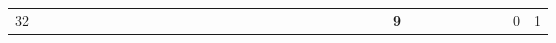 \begin{landscape}
\begin{table}
\begin{adjustwidth}{-2.6cm}{}
{\begin{tabular}{l|lllllllllllllllllllllllllllllllll|ll}
		32   &            &                                                                 &                                                                 &                                                                 &                                                                 &                                                                 &                                                                 &                                                                 &                                                                 &                                                                 &                                                                 &                                                                 &                                                                 &                                                                 &                                                                 &                                                                 &                                                                 &                                                                 &                                                                 &                                                                 &                                                                 &                                                                 &                                                                 &                                                                 &                                                                 & \textbf{9}                                                      &                                                                 &                                                                 &                                                                 &                                                                 &                                                                 &                                                                 &                                                                 & 0          & 1          
	\end{tabular}}
\end{adjustwidth}
\end{table}

\end{landscape}